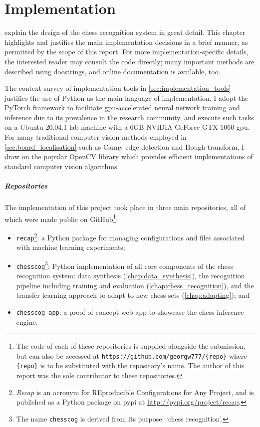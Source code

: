 \documentclass[../report.tex]{subfiles}
\begin{document}
\chapter{Implementation}
\label{chap:implementation}
 explain the design of the chess recognition system in great detail.
This chapter highlights and justifies the main implementation decisions in a brief manner, as permitted by the scope of this report.
For more implementation-specific details, the interested reader may consult the code directly; many important methods are described using docstrings, and online documentation is available, too.

The context survey of implementation tools in \cref{sec:implementation_tools} justifies the use of Python as the main language of implementation.
I adopt the PyTorch framework \cite{pytorch2019} to facilitate \acs{gpu}-accelerated neural network training and inference due to its prevalence in the research community, and execute such tasks on a Ubuntu 20.04.1 lab machine with a 6GB NVIDIA GeForce GTX 1060 \gls{gpu}.
For many traditional computer vision methods employed in \cref{sec:board_localisation} such as Canny edge detection and Hough transform, I draw on the popular OpenCV library \cite{opencv2000} which provides efficient implementations of standard computer vision algorithms.

\paragraph{Repositories}
The implementation of this project took place in three main repositories, all of which were made public on GitHub\footnote{The code of each of these repositories is supplied alongside the submission, but can also be accessed at \texttt{https://github.com/georgw777/\{repo\}} where \texttt{\{repo\}} is to be substituted with the repository's name. The author of this report was the sole contributor to these repositories.}:
\begin{itemize}
    \item \texttt{recap}\footnote{\emph{Recap} is an acronym for REproducible Configurations for Any Project, and is published as a Python package on \acs{pypi} at \url{http://pypi.org/project/recap}.}: a Python package for managing configurations and files associated with machine learning experiments;
    \item \texttt{chesscog}\footnote{The name \texttt{chesscog} is derived from its purpose: `chess recognition'.}: Python implementation of all core components of the chess recognition system: data synthesis (\cref{chap:data_synthesis}), the recognition pipeline including training and evaluation (\cref{chap:chess_recognition}), and the transfer learning approach to adapt to new chess sets (\cref{chap:adapting}); and
    \item \texttt{chesscog-app}: a proof-of-concept web app to showcase the chess inference engine.
\end{itemize}
\end{document}
